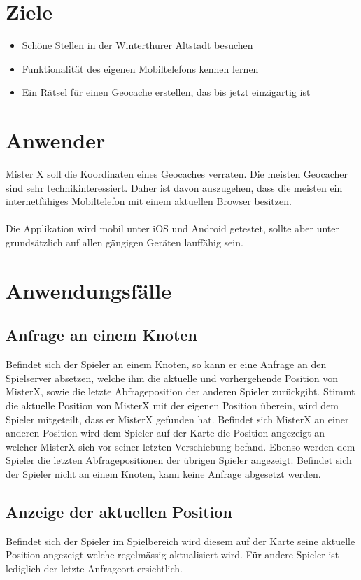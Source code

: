 \documentclass[11pt]{article}
\begin{document}
\section{Ziele}
\begin{itemize}
\item Schöne Stellen in der Winterthurer Altstadt besuchen
\item Funktionalität des eigenen Mobiltelefons kennen lernen
\item Ein Rätsel für einen Geocache erstellen, das bis jetzt einzigartig ist
\end{itemize}


\section{Anwender}
Mister X soll die Koordinaten eines Geocaches verraten. Die meisten Geocacher sind sehr technikinteressiert. Daher ist davon auszugehen, dass die meisten ein internetfähiges Mobiltelefon mit einem aktuellen Browser besitzen. 
\\\\
Die Applikation wird mobil unter iOS und Android getestet, sollte aber unter grundsätzlich auf allen gängigen Geräten lauffähig sein. 

\section{Anwendungsfälle}
\subsection{Anfrage an einem Knoten}
Befindet sich der Spieler an einem Knoten, so kann er eine Anfrage an den Spielserver absetzen, welche ihm die aktuelle und vorhergehende Position von MisterX, sowie die letzte Abfrageposition der anderen Spieler zurückgibt. Stimmt die aktuelle Position von MisterX mit der eigenen Position überein, wird dem Spieler mitgeteilt, dass er MisterX gefunden hat. Befindet sich MisterX an einer anderen Position wird dem Spieler auf der Karte die Position angezeigt an welcher  MisterX sich vor seiner letzten Verschiebung befand. Ebenso werden dem Spieler die letzten Abfragepositionen der übrigen Spieler angezeigt.
Befindet sich der Spieler nicht an einem Knoten, kann keine Anfrage abgesetzt werden.

\subsection{Anzeige der aktuellen Position}
Befindet sich der Spieler im Spielbereich wird diesem auf der Karte seine aktuelle Position angezeigt welche regelmässig aktualisiert wird. Für andere Spieler ist lediglich der letzte Anfrageort ersichtlich.
\end{document}
